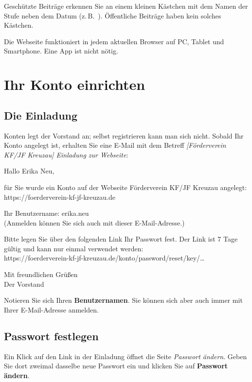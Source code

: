 \documentclass[a4paper,fontsize=10pt]{scrartcl}
\newcommand*{\knopf}[1]{\textbf{\guillemotright #1\guillemotleft}}
\begin{document}
Geschützte Beiträge erkennen Sie an einem kleinen Kästchen mit dem Namen der
Stufe neben dem Datum (z.\,B.\ ).
Öffentliche Beiträge haben kein solches Kästchen.

Die Webseite funktioniert in jedem aktuellen Browser auf PC, Tablet und
Smartphone. Eine App ist nicht nötig.

\section{Ihr Konto einrichten}

\subsection{Die Einladung}

Konten legt der Vorstand an; selbst registrieren kann man sich nicht. Sobald
Ihr Konto angelegt ist, erhalten Sie eine E-Mail mit dem Betreff
\emph{[Förderverein KF/JF Kreuzau] Einladung zur Webseite}:

\begin{dshinweis}[title=Beispiel: Einladung]
\small
Hallo Erika Neu,\par
für Sie wurde ein Konto auf der Webseite \glqq Förderverein KF/JF Kreuzau\grqq{}
angelegt: https://foerderverein-kf-jf-kreuzau.de\par
Ihr Benutzername: erika.neu\\
(Anmelden können Sie sich auch mit dieser E-Mail-Adresse.)\par
Bitte legen Sie über den folgenden Link Ihr Passwort fest. Der Link ist
7 Tage gültig und kann nur einmal verwendet werden:\\
https://foerderverein-kf-jf-kreuzau.de/konto/password/reset/key/…\par
Mit freundlichen Grüßen\\
Der Vorstand
\end{dshinweis}

Notieren Sie sich Ihren \textbf{Benutzernamen}. Sie können sich aber auch
immer mit Ihrer E-Mail-Adresse anmelden.

\subsection{Passwort festlegen}

Ein Klick auf den Link in der Einladung öffnet die Seite \emph{Passwort
ändern}. Geben Sie dort zweimal dasselbe neue Passwort ein und klicken Sie
auf \knopf{Passwort ändern}.
\end{document}
